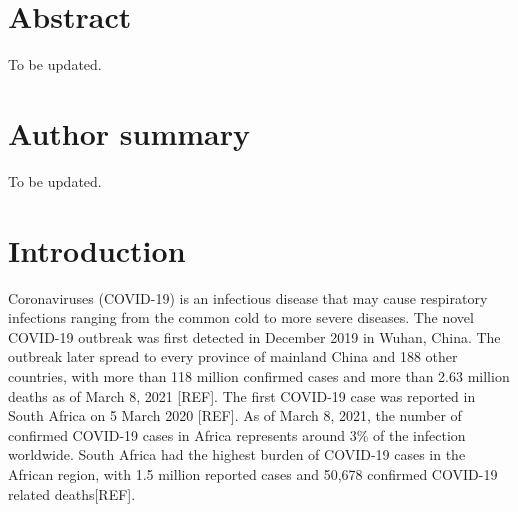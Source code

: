\documentclass[10pt,letterpaper]{article}
\newcommand{\getIndex}[2]{
  \ForEach{,}{\IfEq{#1}{\thislevelitem}{\number\thislevelcount\ExitForEach}{}}{#2}
}
\newcommand{\getAff}[1]{
  \getIndex{#1}{}
}
\begin{document}
\vspace*{0.2in}

\section*{Abstract}
To be updated.

\section*{Author summary}
To be updated.

\linenumbers

\hypertarget{introduction}{%
\section{Introduction}\label{introduction}}
Coronaviruses (COVID-19) is an infectious disease that may cause respiratory infections ranging from the common cold to more severe diseases. The novel COVID-19 outbreak was first detected in December 2019 in Wuhan, China. The outbreak later spread to every province of mainland China and 188 other countries, with more than 118 million confirmed cases and more than 2.63 million deaths as of March 8, 2021 [REF]. The first COVID-19 case was reported in South Africa
on 5 March 2020 [REF]. As of March 8, 2021, the number of confirmed COVID-19 cases in Africa represents around 3\% of the infection worldwide. South Africa had the highest burden of COVID-19 cases in the African region, with 1.5 million reported cases and 50,678 confirmed COVID-19 related deaths[REF].
\end{document}
